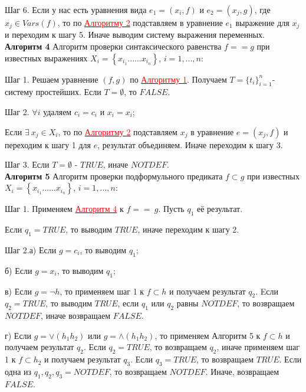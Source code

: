 \documentclass[12pt]{article}
\begin{document}
     Шаг 6. Если у нас есть уравнения вида $e_{1} =(x_{i},f)$ и $e_{2} =(x_{j},g)$, где $x_{j} \in Vars(f)$, то по \hyperlink{a2}{ \textcolor{red}{Алгоритму 2}} подставляем в уравнение $e_{1}$ выражение для $x_{j}$ и переходим к шагу 5. Иначе выводим систему выражения переменных. 
     \\
     
     \hypertarget{a4}{{\bf Алгоритм 4}} Алгоритм проверки синтаксического равенства $f == g $ при известных выражениях $ X_{i} = \left\lbrace x_{i_{1}} ......x_{i_{n}}\right\rbrace $, $i = 1,...,n$: 
       
     Шаг 1. Решаем уравнение $(f,g)$ по \hyperlink{a1}{ \textcolor{red} {Алгоритму 1}}.  Получаем  $T = \lbrace  t_{i}  \rbrace_{i=1}^{n} $- систему простейших. Если  $ T= {\emptyset}$, то $FALSE$.
     
     Шаг 2. $\forall i$ удаляем $c_{i} = c_{i}$ и $x_{i} = x_{i}$;
    
     Если $\exists \: x_{j} \in X_{i}$, то по \hyperlink{a2}{ \textcolor{red}{Алгоритму 2}} подставляем $x_{j}$  в уравнение $e = (x_{j}, f)$ и переходим к шагу 1 для $e$, результат объединяем. Иначе переходим к шагу 3.
     
     Шаг 3. Если $ T= {\emptyset}$ - $TRUE$, иначе $NOTDEF$.
     \\
     
      \hypertarget{a5}{{\bf Алгоритм 5}} Алгоритм проверки подформульного предиката $f \subset g $ при известных $ X_{i} = \left\lbrace x_{i_{1}} ......x_{i_{n}}\right\rbrace $, $i = 1,...,n$:
    
     Шаг 1. Применяем \hyperlink{a3}{ \textcolor{red}{Алгоритм 4}}  к $f == \:g$. Пусть $q_{1}$ её результат.
     
      Если $q_{1} = TRUE$, то выводим $TRUE$, иначе переходим к шагу 2.
     
     Шаг 2.а) Если $ g = c_{i}$, то выводим $q_{1}$;
     
      б) Если $ g = x_{i}$, то выводим $q_{1}$;
      
    в) Если $ g = \neg h$, то применяем  шаг 1 к  $f\subset h$ и получаем результат $q_{2}$. Eсли $q_{2} = TRUE$, то выводим $TRUE$, если $q_{1}$ или $q_{2}$ равны $NOTDEF$, то возвращаем $NOTDEF$, иначе возвращаем $FALSE$.
    
    г) Если $ g = \vee (h_{1} h_{2})$ или  $ g = \wedge (h_{1} h_{2})$, то применяем  Алгоритм 5 к  $f\subset h$   и получаем результат $q_{2}$. Если $q_{2} = TRUE$, то возвращаем $q_{2}$, иначе применяем шаг 1 к $f\subset h_{2}$ и  получаем результат  $q_{3}$. Если $q_{3} = TRUE$, то возвращаем $TRUE$. Если одна из $q_{1}, q_{2}, q_{3} = NOTDEF$, то возвращаем $NOTDEF$. Иначе, возвращаем $FALSE$.
     \\
     
\end{document}
